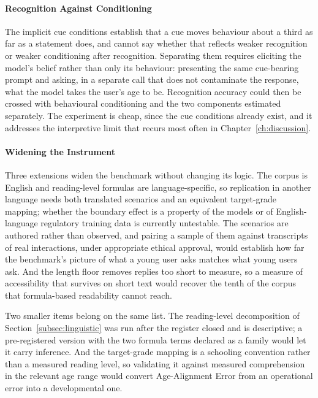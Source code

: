 \paragraph{Recognition Against Conditioning}
\label{sec:future-recognition}

The implicit cue conditions establish that a cue moves behaviour about a third
as far as a statement does, and cannot say whether that reflects weaker
recognition or weaker conditioning after recognition. Separating them requires
eliciting the model's belief rather than only its behaviour: presenting the same
cue-bearing prompt and asking, in a separate call that does not contaminate the
response, what the model takes the user's age to be. Recognition accuracy could
then be crossed with behavioural conditioning and the two components estimated
separately. The experiment is cheap, since the cue conditions already exist, and
it addresses the interpretive limit that recurs most often in
Chapter~\ref{ch:discussion}.

\paragraph{Widening the Instrument}
\label{sec:future-instrument}

Three extensions widen the benchmark without changing its logic. The corpus is
English and reading-level formulas are language-specific, so replication in
another language needs both translated scenarios and an equivalent target-grade
mapping; whether the boundary effect is a property of the models or of
English-language regulatory training data is currently untestable. The scenarios
are authored rather than observed, and pairing a sample of them against
transcripts of real interactions, under appropriate ethical approval, would
establish how far the benchmark's picture of what a young user asks matches what
young users ask. And the length floor removes replies too short to measure, so a
measure of accessibility that survives on short text would recover the tenth of
the corpus that formula-based readability cannot reach.

Two smaller items belong on the same list. The reading-level decomposition of
Section~\ref{subsec:linguistic} was run after the register closed and is
descriptive; a pre-registered version with the two formula terms declared as a
family would let it carry inference. And the target-grade mapping is a schooling
convention rather than a measured reading level, so validating it against
measured comprehension in the relevant age range would convert Age-Alignment
Error from an operational error into a developmental one.

